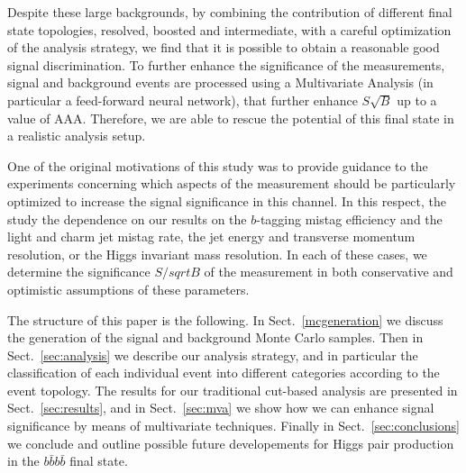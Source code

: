 Despite these large backgrounds, by combining the contribution of different final state
topologies, resolved, boosted and intermediate, with a careful optimization
of the analysis strategy, we find that it is possible to obtain a reasonable
good signal discrimination.
%
To further enhance the significance of the measurements, signal and background events
are processed using a Multivariate Analysis (in particular a feed-forward neural
network), that further enhance $S\sqrt{B}$ up to a value of AAA.
%
Therefore, we are able to rescue the potential of this final state in a realistic
analysis setup.

One of the original motivations of this study was to provide guidance to the experiments
concerning which aspects of the measurement should be particularly optimized
to increase the signal significance in this channel.
%
In this respect, the study the dependence on our results on the $b$-tagging mistag
efficiency and the light and charm jet mistag rate, the jet energy and transverse
momentum resolution, or the Higgs invariant mass resolution.
%
In each of these cases, we determine the significance  $S/sqrt{B}$ of the
measurement in both conservative and optimistic assumptions of these
parameters.


The structure of this paper is the following.
%
In Sect.~\ref{mcgeneration} we discuss the generation of the signal
and background Monte Carlo samples.
%
Then in Sect.~\ref{sec:analysis}
we describe our analysis strategy, and in particular
the classification of each individual event into
different categories according to the event topology.
%
The results for our traditional cut-based analysis
are presented in Sect.~\ref{sec:results}, and in
Sect.~\ref{sec:mva} we show how we can enhance signal
significance by means of multivariate techniques.
%
Finally in Sect.~\ref{sec:conclusions} we conclude and outline
possible future developements for Higgs pair production
in the $b\bar{b}b\bar{b}$ final state.
